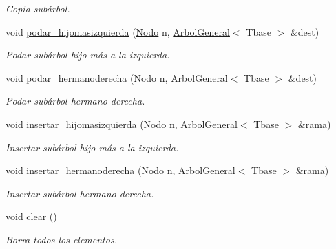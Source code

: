 \begin{DoxyCompactItemize}
\begin{DoxyCompactList}\small\item\em Copia subárbol. \end{DoxyCompactList}\item 
void \hyperlink{class_arbol_general_a7f2fa2d9be4af4b7be1c334819a04c39}{podar\+\_\+hijomasizquierda} (\hyperlink{class_arbol_general_a12cc1b74a9095d89bc7334290d332f7a}{Nodo} n, \hyperlink{class_arbol_general}{Arbol\+General}$<$ Tbase $>$ \&dest)
\begin{DoxyCompactList}\small\item\em Podar subárbol hijo más a la izquierda. \end{DoxyCompactList}\item 
void \hyperlink{class_arbol_general_a81282ccc37494f1e13042e06ea475fb6}{podar\+\_\+hermanoderecha} (\hyperlink{class_arbol_general_a12cc1b74a9095d89bc7334290d332f7a}{Nodo} n, \hyperlink{class_arbol_general}{Arbol\+General}$<$ Tbase $>$ \&dest)
\begin{DoxyCompactList}\small\item\em Podar subárbol hermano derecha. \end{DoxyCompactList}\item 
void \hyperlink{class_arbol_general_acf95226edb2a4e4c7fba82aaa82d0ec9}{insertar\+\_\+hijomasizquierda} (\hyperlink{class_arbol_general_a12cc1b74a9095d89bc7334290d332f7a}{Nodo} n, \hyperlink{class_arbol_general}{Arbol\+General}$<$ Tbase $>$ \&rama)
\begin{DoxyCompactList}\small\item\em Insertar subárbol hijo más a la izquierda. \end{DoxyCompactList}\item 
void \hyperlink{class_arbol_general_a855d44f14a9ef638f8dd46376fc2f961}{insertar\+\_\+hermanoderecha} (\hyperlink{class_arbol_general_a12cc1b74a9095d89bc7334290d332f7a}{Nodo} n, \hyperlink{class_arbol_general}{Arbol\+General}$<$ Tbase $>$ \&rama)
\begin{DoxyCompactList}\small\item\em Insertar subárbol hermano derecha. \end{DoxyCompactList}\item 
void \hyperlink{class_arbol_general_a3ae21db42586b23ccc082aeb321db56f}{clear} ()
\begin{DoxyCompactList}\small\item\em Borra todos los elementos. \end{DoxyCompactList}\item 

\end{DoxyCompactItemize}
